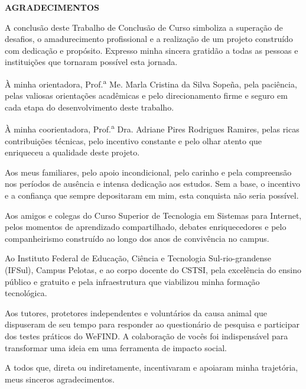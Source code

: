 \thispagestyle{empty}

\begin{center}
    \textbf{\large AGRADECIMENTOS}
\end{center}

\vspace{1.5cm}

A conclusão deste Trabalho de Conclusão de Curso simboliza a superação de desafios, o amadurecimento profissional e a realização de um projeto construído com dedicação e propósito. Expresso minha sincera gratidão a todas as pessoas e instituições que tornaram possível esta jornada.

À minha orientadora, Prof.\textsuperscript{a} Me. Marla Cristina da Silva Sopeña, pela paciência, pelas valiosas orientações acadêmicas e pelo direcionamento firme e seguro em cada etapa do desenvolvimento deste trabalho.

À minha coorientadora, Prof.\textsuperscript{a} Dra. Adriane Pires Rodrigues Ramires, pelas ricas contribuições técnicas, pelo incentivo constante e pelo olhar atento que enriqueceu a qualidade deste projeto.

Aos meus familiares, pelo apoio incondicional, pelo carinho e pela compreensão nos períodos de ausência e intensa dedicação aos estudos. Sem a base, o incentivo e a confiança que sempre depositaram em mim, esta conquista não seria possível.

Aos amigos e colegas do Curso Superior de Tecnologia em Sistemas para Internet, pelos momentos de aprendizado compartilhado, debates enriquecedores e pelo companheirismo construído ao longo dos anos de convivência no campus.

Ao Instituto Federal de Educação, Ciência e Tecnologia Sul-rio-grandense (IFSul), Campus Pelotas, e ao corpo docente do CSTSI, pela excelência do ensino público e gratuito e pela infraestrutura que viabilizou minha formação tecnológica.

Aos tutores, protetores independentes e voluntários da causa animal que dispuseram de seu tempo para responder ao questionário de pesquisa e participar dos testes práticos do WeFIND. A colaboração de vocês foi indispensável para transformar uma ideia em uma ferramenta de impacto social.

A todos que, direta ou indiretamente, incentivaram e apoiaram minha trajetória, meus sinceros agradecimentos.

\clearpage

